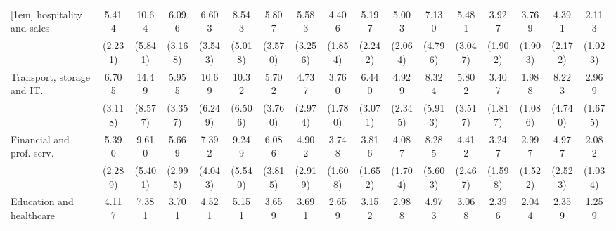 {\begin{tabular}{l*{16}{c}}
[1em]
hospitality and sales&       5.414\sym{***}&       10.64\sym{***}&       6.096\sym{***}&       6.603\sym{***}&       8.543\sym{***}&       5.807\sym{**} &       5.583\sym{**} &       4.406\sym{***}&       5.197\sym{***}&       5.003\sym{***}&       7.130\sym{**} &       5.481\sym{**} &       3.927\sym{**} &       3.769\sym{**} &       4.391\sym{**} &       2.113         \\
                    &     (2.231)         &     (5.841)         &     (3.168)         &     (3.543)         &     (5.018)         &     (3.570)         &     (3.256)         &     (1.854)         &     (2.242)         &     (2.064)         &     (4.796)         &     (3.047)         &     (1.902)         &     (1.903)         &     (2.172)         &     (1.023)         \\
[1em]
Transport, storage and IT.&       6.705\sym{***}&       14.49\sym{***}&       5.955\sym{**} &       10.69\sym{***}&       10.32\sym{***}&       5.702\sym{**} &       4.737\sym{*}  &       3.760\sym{**} &       6.440\sym{***}&       4.929\sym{***}&       8.324\sym{**} &       5.802\sym{**} &       3.407\sym{*}  &       1.988         &       8.223\sym{***}&       2.969         \\
                    &     (3.118)         &     (8.577)         &     (3.357)         &     (6.249)         &     (6.506)         &     (3.760)         &     (2.974)         &     (1.780)         &     (3.071)         &     (2.345)         &     (5.913)         &     (3.517)         &     (1.817)         &     (1.086)         &     (4.740)         &     (1.675)         \\
[1em]
Financial and prof. serv.&       5.390\sym{***}&       9.610\sym{***}&       5.669\sym{**} &       7.392\sym{***}&       9.249\sym{***}&       6.086\sym{**} &       4.902\sym{**} &       3.748\sym{**} &       3.816\sym{**} &       4.087\sym{***}&       8.285\sym{**} &       4.412\sym{**} &       3.247\sym{*}  &       2.997\sym{*}  &       4.977\sym{**} &       2.082         \\
                    &     (2.289)         &     (5.401)         &     (2.995)         &     (4.043)         &     (5.540)         &     (3.815)         &     (2.919)         &     (1.608)         &     (1.652)         &     (1.704)         &     (5.603)         &     (2.467)         &     (1.598)         &     (1.522)         &     (2.523)         &     (1.034)         \\
[1em]
Education and healthcare&       4.117\sym{***}&       7.381\sym{***}&       3.701\sym{*}  &       4.521\sym{**} &       5.151\sym{**} &       3.659\sym{*}  &       3.691\sym{*}  &       2.659\sym{*}  &       3.152\sym{**} &       2.988\sym{**} &       4.973\sym{*}  &       3.068\sym{*}  &       2.396         &       2.044         &       2.359         &       1.259         \\

\end{tabular}}
